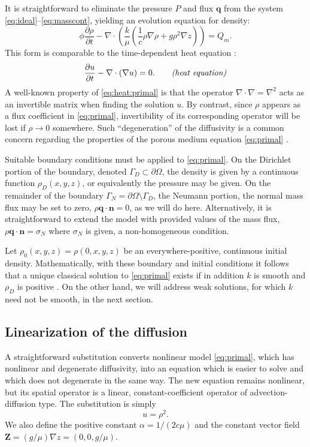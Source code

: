\documentclass[11pt]{amsart}
\newcommand{\bn}{\mathbf{n}}
\newcommand{\bq}{\mathbf{q}}
\newcommand{\bZ}{\mathbf{Z}}
\newcommand{\Div}{\nabla\cdot}
\newcommand{\grad}{\nabla}
\begin{document}
It is straightforward to eliminate the pressure $P$ and flux $\bq$ from the system \eqref{eq:ideal}--\eqref{eq:masscont}, yielding an evolution equation for density:
\begin{equation}
\phi \frac{\partial \rho}{\partial t} - \Div \left(\frac{k}{\mu} \left(\frac{1}{c} \rho \grad \rho + g \rho^2 \grad z\right)\right) = Q_m. \label{eq:primal}
\end{equation}
This form is comparable to the time-dependent heat equation \citep{Evans2010}:
\begin{equation}
\frac{\partial u}{\partial t} - \Div(\grad u) = 0. \qquad \text{\emph{(heat equation)}}\label{eq:heat:primal}
\end{equation}
A well-known property of \eqref{eq:heat:primal} is that the operator $\Div \grad = \grad^2$ acts as an invertible matrix when finding the solution $u$.  By contrast, since $\rho$ appears as a flux coefficient in \eqref{eq:primal}, invertibility of its corresponding operator will be lost if $\rho\to 0$ somewhere.  Such ``degeneration'' of the diffusivity is a common concern regarding the properties of the porous medium equation \eqref{eq:primal} \citep[for example]{Vazquez2007}.

Suitable boundary conditions must be applied to \eqref{eq:primal}.  On the Dirichlet portion of the boundary, denoted $\Gamma_D \subset \partial\Omega$, the density is given by a continuous function $\rho_D(x,y,z)$, or equivalently the pressure may be given.  On the remainder of the boundary $\Gamma_N = \partial\Omega \setminus \Gamma_D$, the Neumann portion, the normal mass flux may be set to zero, $\rho\bq\cdot \bn = 0$, as we will do here.  Alternatively, it is straightforward to extend the model with provided values of the mass flux, $\rho\bq\cdot \bn = \sigma_N$ where $\sigma_N$ is given, a non-homogeneous condition.

Let $\rho_0(x,y,z)=\rho(0,x,y,z)$ be an everywhere-positive, continuous initial density.  Mathematically, with these boundary and initial conditions it follows that a unique classical solution to \eqref{eq:primal} exists if in addition $k$ is smooth and $\rho_D$ is positive \citep[Theorem 3.1]{Vazquez2007}.  On the other hand, we will address weak solutions, for which $k$ need not be smooth, in the next section.

\subsection{Linearization of the diffusion}  A straightforward substitution converts nonlinear model \eqref{eq:primal}, which has nonlinear and degenerate diffusivity, into an equation which is easier to solve and which does not degenerate in the same way.  The new equation remains nonlinear, but its spatial operator is a linear, constant-coefficient operator of advection-diffusion type.  The substitution is simply
\begin{equation}
u = \rho^2. \label{eq:defu}
\end{equation}
We also define the positive constant $\alpha = 1/(2c\mu)$ and the constant vector field $\bZ=(g/\mu) \grad z=(0,0,g/\mu)$.
\end{document}
